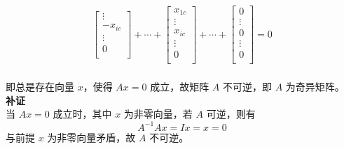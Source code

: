 \documentclass[UTF8,nofonts]{ctexart}
\begin{document}
\begin{gather*}
\begin{bmatrix}
\vdots \\
-x_{ic} \\ 
\vdots  \\
0 \\
\end{bmatrix} 
+ \cdots +
\begin{bmatrix} 
x_{1c} \\ 
\vdots  \\
x_{ic} \\
\vdots \\
0 \\
\end{bmatrix} 
+ \cdots +
\begin{bmatrix} 
0 \\ 
\vdots  \\
0 \\ 
\vdots  \\
0 \\
\end{bmatrix}
= 0 \\
\end{gather*}


即总是存在向量 $x$，使得 $Ax=0$ 成立，故矩阵 $A$ 不可逆，即 $A$ 为奇异矩阵。\\


\textbf{补证} \\

当 $Ax=0$ 成立时，其中 $x$ 为非零向量，若 $A$ 可逆，则有
\begin{equation*}
A^{-1}Ax=Ix=x=0
\end{equation*}
与前提 $x$ 为非零向量矛盾，故 $A$ 不可逆。
\end{document}
